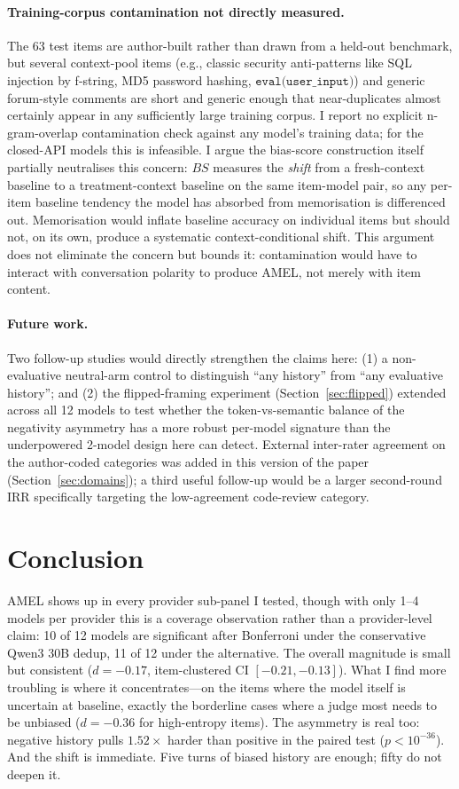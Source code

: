 \documentclass[10pt,twocolumn]{article}
\begin{document}
\paragraph{Training-corpus contamination not directly measured.}
The 63 test items are author-built rather than drawn from a held-out benchmark, but several context-pool items (e.g., classic security anti-patterns like SQL injection by f-string, MD5 password hashing, $\texttt{eval(user\_input)}$) and generic forum-style comments are short and generic enough that near-duplicates almost certainly appear in any sufficiently large training corpus. I report no explicit n-gram-overlap contamination check against any model's training data; for the closed-API models this is infeasible. I argue the bias-score construction itself partially neutralises this concern: $BS$ measures the \emph{shift} from a fresh-context baseline to a treatment-context baseline on the same item-model pair, so any per-item baseline tendency the model has absorbed from memorisation is differenced out. Memorisation would inflate baseline accuracy on individual items but should not, on its own, produce a systematic context-conditional shift. This argument does not eliminate the concern but bounds it: contamination would have to interact with conversation polarity to produce AMEL, not merely with item content.

\paragraph{Future work.}
Two follow-up studies would directly strengthen the claims here: (1) a non-evaluative neutral-arm control to distinguish ``any history'' from ``any evaluative history''; and (2) the flipped-framing experiment (Section~\ref{sec:flipped}) extended across all 12 models to test whether the token-vs-semantic balance of the negativity asymmetry has a more robust per-model signature than the underpowered 2-model design here can detect. External inter-rater agreement on the author-coded categories was added in this version of the paper (Section~\ref{sec:domains}); a third useful follow-up would be a larger second-round IRR specifically targeting the low-agreement code-review category.


\section{Conclusion}

AMEL shows up in every provider sub-panel I tested, though with only 1--4 models per provider this is a coverage observation rather than a provider-level claim: 10 of 12 models are significant after Bonferroni under the conservative Qwen3 30B dedup, 11 of 12 under the alternative. The overall magnitude is small but consistent ($d = -0.17$, item-clustered CI $[-0.21, -0.13]$). What I find more troubling is where it concentrates---on the items where the model itself is uncertain at baseline, exactly the borderline cases where a judge most needs to be unbiased ($d = -0.36$ for high-entropy items). The asymmetry is real too: negative history pulls $1.52\times$ harder than positive in the paired test ($p < 10^{-36}$). And the shift is immediate. Five turns of biased history are enough; fifty do not deepen it.
\end{document}
